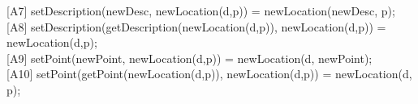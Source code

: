 \documentclass[12pt]{article}
\begin{document}
\begin{spacing}{1.5}
\hspace*{5mm} [A7] setDescription(newDesc, newLocation(d,p)) = newLocation(newDesc, p);\\
\hspace*{5mm} [A8] setDescription(getDescription(newLocation(d,p)), newLocation(d,p)) = newLocation(d,p);\\
\hspace*{5mm} [A9] setPoint(newPoint, newLocation(d,p)) = newLocation(d, newPoint);\\
\hspace*{5mm} [A10] setPoint(getPoint(newLocation(d,p)), newLocation(d,p)) = newLocation(d, p);\\




\end{spacing}
\end{document}
